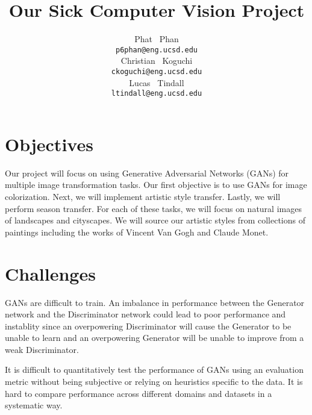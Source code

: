 \documentclass{article} %
\title{Our Sick Computer Vision Project}
\author{
Phat ~Phan\\
\texttt{p6phan@eng.ucsd.edu} \\ \And
Christian ~Koguchi\\
\texttt{ckoguchi@eng.ucsd.edu} \\ \And
Lucas ~Tindall\\
\texttt{ltindall@eng.ucsd.edu} \\ 
}
\begin{document}
\maketitle

\begin{abstract}

\end{abstract}

\section{Objectives}
Our project will focus on using Generative Adversarial Networks (GANs) for multiple image transformation tasks. Our first objective is to use GANs for image colorization. Next, we will implement artistic style transfer. Lastly, we will perform season transfer. For each of these tasks, we will focus on natural images of landscapes and cityscapes. We will source our artistic styles from collections of paintings including the works of Vincent Van Gogh and Claude Monet. 



\section{Challenges}

GANs are difficult to train.  An imbalance in performance between the Generator network and the Discriminator network could lead to poor performance and instablity since an overpowering Discriminator will cause the Generator to be unable to learn and an overpowering Generator will be unable to improve from a weak Discriminator. 

It is difficult to quantitatively test the performance of GANs using an evaluation metric without being subjective or relying on heuristics specific to the data.  It is hard to compare performance across different domains and datasets in a systematic way.  




\end{document}
